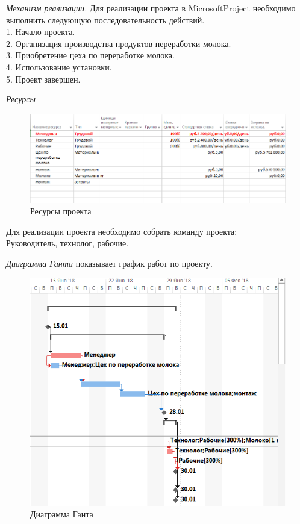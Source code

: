 \textit{Механизм реализации.}
Для реализации проекта в MicrosoftProject необходимо выполнить следующую последовательность действий.
\\
1. Начало проекта.
\\
2. Организация производства продуктов переработки молока.
\\
3. Приобретение цеха по переработке молока.
\\
4. Использование установки.
\\
5. Проект завершен.

\textit{Ресурсы}
\begin{figure}[!h]
	\centering
	\includegraphics[width=1\linewidth]{fig13}
	\caption{Ресурсы проекта}
	\label{fig:fig12}
\end{figure}
Для реализации проекта необходимо собрать команду проекта:\\
Руководитель, технолог, рабочие.

\newpage
\textit{Диаграмма Ганта} показывает график работ по проекту.
\begin{figure}[!h]
	\centering
	\includegraphics[width=1\linewidth]{fig12}
	\caption{Диаграмма Ганта}
	\label{fig:fig13}
\end{figure}
\newpage

